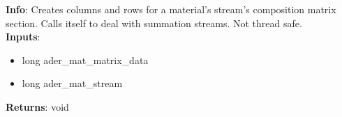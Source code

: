 \textbf{Info}: Creates columns and rows for a material's stream's composition
matrix section. Calls itself to deal with summation streams. Not thread safe.
\\

\noindent \textbf{Inputs}:
\begin{itemize}
\item{long ader\_mat\_matrix\_data}
\item{long ader\_mat\_stream}
\end{itemize}

\noindent \textbf{Returns}: void
